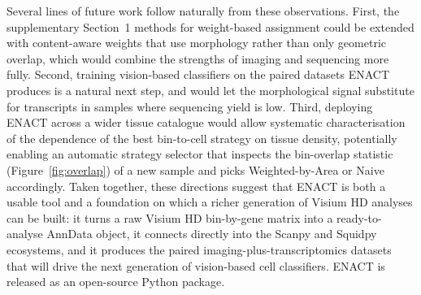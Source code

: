 \documentclass[11pt]{article}
\begin{document}
Several lines of future work follow naturally from these observations. First, the supplementary Section~1 methods for weight-based assignment could be extended with content-aware weights that use morphology rather than only geometric overlap, which would combine the strengths of imaging and sequencing more fully. Second, training vision-based classifiers on the paired datasets ENACT produces is a natural next step, and would let the morphological signal substitute for transcripts in samples where sequencing yield is low. Third, deploying ENACT across a wider tissue catalogue would allow systematic characterisation of the dependence of the best bin-to-cell strategy on tissue density, potentially enabling an automatic strategy selector that inspects the bin-overlap statistic (Figure~\ref{fig:overlap}) of a new sample and picks Weighted-by-Area or Naive accordingly. Taken together, these directions suggest that ENACT is both a usable tool and a foundation on which a richer generation of Visium HD analyses can be built: it turns a raw Visium HD bin-by-gene matrix into a ready-to-analyse AnnData object, it connects directly into the Scanpy and Squidpy ecosystems, and it produces the paired imaging-plus-transcriptomics datasets that will drive the next generation of vision-based cell classifiers. ENACT is released as an open-source Python package.



\end{document}
